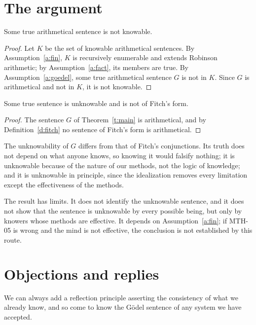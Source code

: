\documentclass{situationist-preprint}
\begin{document}
\section{The argument}

\begin{theorem}\label{t:main}
Some true arithmetical sentence is not knowable.
\end{theorem}

\begin{proof}
Let $K$ be the set of knowable arithmetical sentences. By Assumption~\ref{a:fin}, $K$ is recursively enumerable and extends Robinson arithmetic; by Assumption~\ref{a:fact}, its members are true. By Assumption~\ref{a:goedel}, some true arithmetical sentence $G$ is not in $K$. Since $G$ is arithmetical and not in $K$, it is not knowable.
\end{proof}

\begin{corollary}\label{c:fitch}
Some true sentence is unknowable and is not of Fitch's form.
\end{corollary}

\begin{proof}
The sentence $G$ of Theorem~\ref{t:main} is arithmetical, and by Definition~\ref{d:fitch} no sentence of Fitch's form is arithmetical.
\end{proof}

The unknowability of $G$ differs from that of Fitch's conjunctions. Its truth does not depend on what anyone knows, so knowing it would falsify nothing; it is unknowable because of the nature of our methods, not the logic of knowledge; and it is unknowable in principle, since the idealization removes every limitation except the effectiveness of the methods.

The result has limits. It does not identify the unknowable sentence, and it does not show that the sentence is unknowable by every possible being, but only by knowers whose methods are effective. It depends on Assumption~\ref{a:fin}; if MTH-05 is wrong and the mind is not effective, the conclusion is not established by this route.

\section{Objections and replies}

\begin{objection}
We can always add a reflection principle asserting the consistency of what we already know, and so come to know the Gödel sentence of any system we have accepted.
\end{objection}
\end{document}
